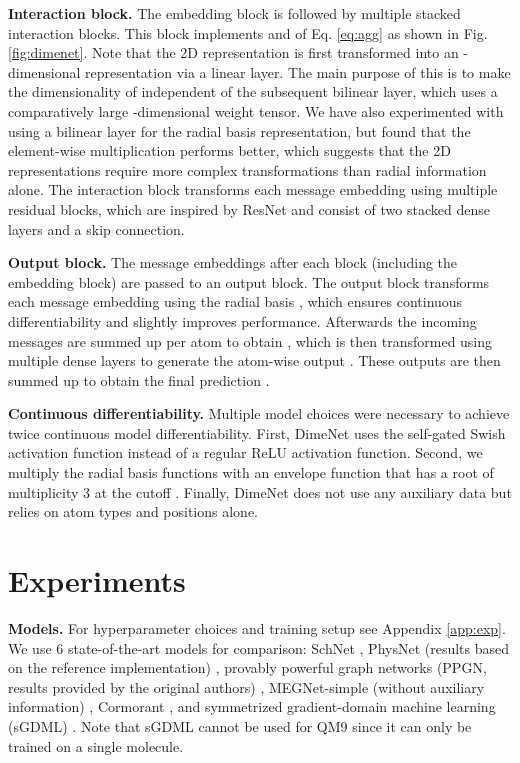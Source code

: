 \documentclass{article} \usepackage{iclr2020_conference,times}
\begin{document}
\textbf{Interaction block.} The embedding block is followed by multiple stacked interaction blocks. This block implements  and  of Eq. \ref{eq:agg} as shown in Fig. \ref{fig:dimenet}. Note that the 2D representation  is first transformed into an -dimensional representation via a linear layer. The main purpose of this is to make the dimensionality of  independent of the subsequent bilinear layer, which uses a comparatively large -dimensional weight tensor. We have also experimented with using a bilinear layer for the radial basis representation, but found that the element-wise multiplication  performs better, which suggests that the 2D representations require more complex transformations than radial information alone. The interaction block transforms each message embedding  using multiple residual blocks, which are inspired by ResNet \citep{he_deep_2016} and consist of two stacked dense layers and a skip connection.

\textbf{Output block.} The message embeddings after each block (including the embedding block) are passed to an output block. The output block transforms each message embedding  using the radial basis , which ensures continuous differentiability and slightly improves performance. Afterwards the incoming messages are summed up per atom  to obtain , which is then transformed using multiple dense layers to generate the atom-wise output . These outputs are then summed up to obtain the final prediction .

\textbf{Continuous differentiability.} Multiple model choices were necessary to achieve twice continuous model differentiability. First, DimeNet uses the self-gated Swish activation function  \citep{ramachandran_searching_2018} instead of a regular ReLU activation function. Second, we multiply the radial basis functions  with an envelope function  that has a root of multiplicity 3 at the cutoff . Finally, DimeNet does not use any auxiliary data but relies on atom types and positions alone.

\section{Experiments} \label{sec:exp}

\textbf{Models.} For hyperparameter choices and training setup see Appendix \ref{app:exp}. We use 6 state-of-the-art models for comparison: SchNet \citep{schutt_schnet:_2017}, PhysNet (results based on the reference implementation) \citep{unke_physnet:_2019}, provably powerful graph networks (PPGN, results provided by the original authors) \citep{maron_provably_2019}, MEGNet-simple (without auxiliary information) \citep{chen_graph_2019}, Cormorant \citep{anderson_cormorant:_2019}, and symmetrized gradient-domain machine learning (sGDML) \citep{chmiela_towards_2018}. Note that sGDML cannot be used for QM9 since it can only be trained on a single molecule.
\end{document}
